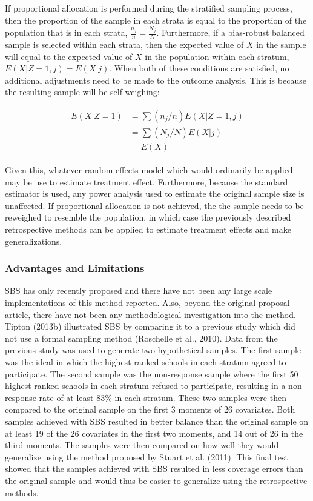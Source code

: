 \documentclass[man,floatsintext]{apa6}
\begin{document}
If proportional allocation is performed during the stratified sampling process, then the proportion of the sample in each strata is equal to the proportion of the population that is in each strata, \(\frac{n_j}{n} = \frac{N_j}{N}\). Furthermore, if a bias-robust balanced sample is selected within each strata, then the expected value of \(X\) in the sample will equal to the expected value of \(X\) in the population within each stratum, \(E(X|Z=1,j) = E(X|j)\). When both of these conditions are satisfied, no additional adjustments need to be made to the outcome analysis. This is because the resulting sample will be self-weighing:

\begin{align}
  \begin{split}
    E(X | Z = 1) &= \sum{(n_j/n)E(X | Z = 1, j)} \\
      &= \sum{(N_j/N)E(X | j)} \\
      &= E(X)
  \end{split}
\end{align}

Given this, whatever random effects model which would ordinarily be applied may be use to estimate treatment effect. Furthermore, because the standard estimator is used, any power analysis used to estimate the original sample size is unaffected. If proportional allocation is not achieved, the the sample needs to be reweighed to resemble the population, in which case the previously described retrospective methods can be applied to estimate treatment effects and make generalizations.

\hypertarget{advantages-and-limitations}{%
\subsubsection{Advantages and Limitations}\label{advantages-and-limitations}}

SBS has only recently proposed and there have not been any large scale implementations of this method reported. Also, beyond the original proposal article, there have not been any methodological investigation into the method. Tipton (2013b) illustrated SBS by comparing it to a previous study which did not use a formal sampling method (Roschelle et al., 2010). Data from the previous study was used to generate two hypothetical samples. The first sample was the ideal in which the highest ranked schools in each stratum agreed to participate. The second sample was the non-response sample where the first 50 highest ranked schools in each stratum refused to participate, resulting in a non-response rate of at least 83\% in each stratum. These two samples were then compared to the original sample on the first 3 moments of 26 covariates. Both samples achieved with SBS resulted in better balance than the original sample on at least 19 of the 26 covariates in the first two moments, and 14 out of 26 in the third moments. The samples were then compared on how well they would generalize using the method proposed by Stuart et al. (2011). This final test showed that the samples achieved with SBS resulted in less coverage errors than the original sample and would thus be easier to generalize using the retrospective methods.
\end{document}
